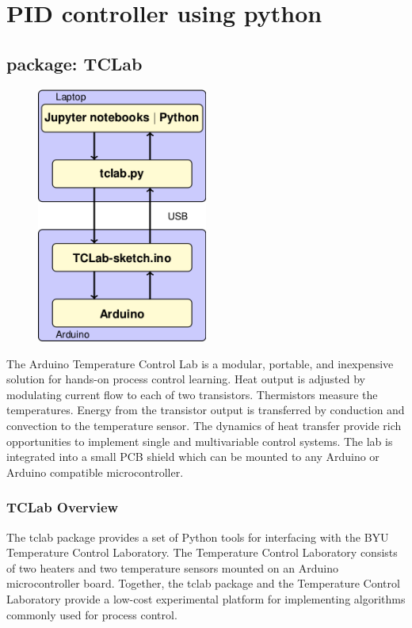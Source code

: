 \chapter{\label{method}PID controller using python}

\section{package: TCLab}

\begin{figure} 
    \centering
    \includegraphics[width=0.5\textwidth]{TCLabOverview.png}
\end{figure}
The Arduino Temperature Control Lab is a modular, portable, and inexpensive solution for hands-on process control learning. Heat output is adjusted by modulating current flow to each of two transistors. Thermistors measure the temperatures. Energy from the transistor output is transferred by conduction and convection to the temperature sensor. The dynamics of heat transfer provide rich opportunities to implement single and multivariable control systems. The lab is integrated into a small PCB shield which can be mounted to any Arduino or Arduino compatible microcontroller.

\subsection{TCLab Overview}




The tclab package provides a set of Python tools for interfacing with the BYU Temperature Control Laboratory. The Temperature Control Laboratory consists of two heaters and two temperature sensors mounted on an Arduino microcontroller board. Together, the tclab package and the Temperature Control Laboratory provide a low-cost experimental platform for implementing algorithms commonly used for process control.

